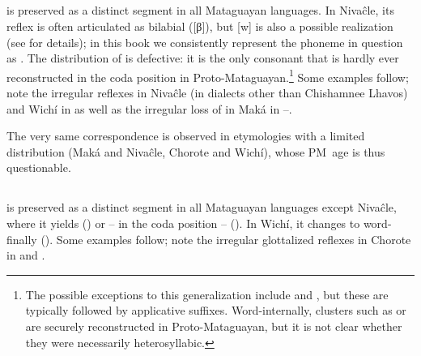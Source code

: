 \subsection{}\label{proto-w}
 is preserved as a distinct segment in all Mataguayan languages. In Nivaĉle, its reflex is often articulated as bilabial ([β]), but [w] is also a possible realization (see  for details); in this book we consistently represent the phoneme in question as . The distribution of  is defective: it is the only consonant that is hardly ever reconstructed in the coda position in Proto-Mataguayan.\footnote{The possible exceptions to this generalization include  and , but these are typically followed by applicative suffixes. Word-internally, clusters such as  or  are securely reconstructed in Proto-Mataguayan, but it is not clear whether they were necessarily heterosyllabic.} Some examples follow; note the irregular reflexes in Nivaĉle (in dialects other than Chishamnee Lhavos) and Wichí in  as well as the irregular loss of  in Maká in --.

\begin{exe}
    \ex \flower
    \ex \wildmanioc
    \ex \abdcavity
    \ex \river
    \ex \termitehouse
    \ex \demwa
    \ex \guayacan
    \ex \paloflojof
    \ex \paloflojot
    \ex \badmood
    \ex \allrcpr
    \ex \burrow
    \ex \bromelia \label{w-bromelia}
    \ex \dov
    \ex \worm
    \ex \throwv
    \ex \cardinal
    \ex \blackalgarrobof \label{w-blackalgarrobof}
    \ex \blackalgarrobot \label{w-blackalgarrobot}
    \ex \expert
    \ex \largefat
    \ex \spring
    \ex \moon
    \ex \peccary
    \ex \puma
\end{exe}

The very same correspondence is observed in etymologies with a limited distribution (Maká and Nivaĉle, Chorote and Wichí), whose PM~age is thus questionable.

\begin{exe}
    \ex \hole
    \ex \hookmn
    \ex \limpkin
    \ex \ashamedmn
    \ex \tireddie
    \ex \wolf
    \ex \piranhamn
    \ex \skymn
    \ex \cloudmn
    \ex \balawasp
    \ex \burnvt
    \ex \wut
    \ex \fox
\end{exe}

\subsection{}\label{proto-l}
 is preserved as a distinct segment in all Mataguayan languages except Nivaĉle, where it yields  () or -- in the coda position --  (). In Wichí, it changes to  word-finally (). Some examples follow; note the irregular glottalized reflexes in Chorote in  and .

